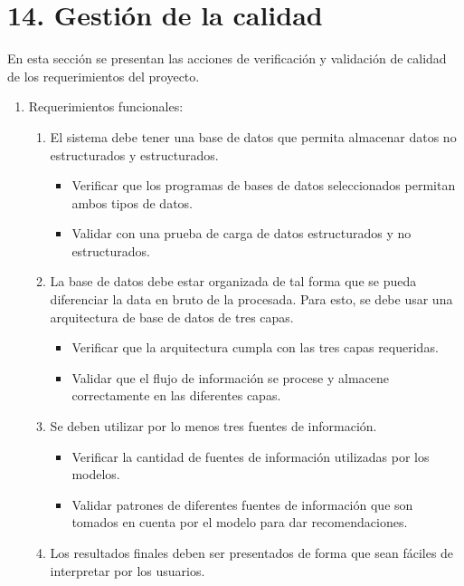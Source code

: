 \documentclass[
11pt, %
codirector, %
]{charter}
\begin{document}
\section{14. Gestión de la calidad}
\label{sec:calidad}

En esta sección se presentan las acciones de verificación y validación de calidad de los requerimientos del proyecto.

\begin{enumerate}
	\item Requerimientos funcionales:
		\begin{enumerate}
			\item El sistema debe tener una base de datos que permita almacenar datos no estructurados y estructurados.
                    \begin{itemize}
                    	\item Verificar que los programas de bases de datos seleccionados permitan ambos tipos de datos.
                    	\item Validar con una prueba de carga de datos estructurados y no estructurados.
                    \end{itemize}
                \item La base de datos debe estar organizada de tal forma que se pueda diferenciar la data en bruto de la procesada. Para esto, se debe usar una arquitectura de base de datos de tres capas.
                    \begin{itemize}
                    	\item Verificar que la arquitectura cumpla con las tres capas requeridas.
                    	\item Validar que el flujo de información se procese y almacene correctamente en las diferentes capas.
                    \end{itemize}
			\item Se deben utilizar por lo menos tres fuentes de información.
                    \begin{itemize}
                    	\item Verificar la cantidad de fuentes de información utilizadas por los modelos.
                    	\item Validar patrones de diferentes fuentes de información que son tomados en cuenta por el modelo para dar recomendaciones.
                    \end{itemize}
			\item Los resultados finales deben ser presentados de forma que sean fáciles de interpretar por los usuarios.

\end{enumerate}
\end{enumerate}
\end{document}
